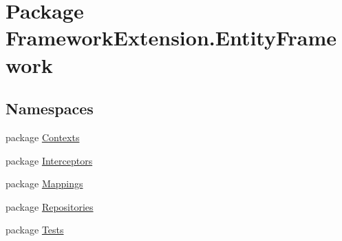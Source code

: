 \hypertarget{namespace_framework_extension_1_1_entity_framework}{\section{Package Framework\-Extension.\-Entity\-Framework}
\label{namespace_framework_extension_1_1_entity_framework}
}
\subsection*{Namespaces}
\begin{DoxyCompactItemize}
\item 
package \hyperlink{namespace_framework_extension_1_1_entity_framework_1_1_contexts}{Contexts}
\item 
package \hyperlink{namespace_framework_extension_1_1_entity_framework_1_1_interceptors}{Interceptors}
\item 
package \hyperlink{namespace_framework_extension_1_1_entity_framework_1_1_mappings}{Mappings}
\item 
package \hyperlink{namespace_framework_extension_1_1_entity_framework_1_1_repositories}{Repositories}
\item 
package \hyperlink{namespace_framework_extension_1_1_entity_framework_1_1_tests}{Tests}
\end{DoxyCompactItemize}
